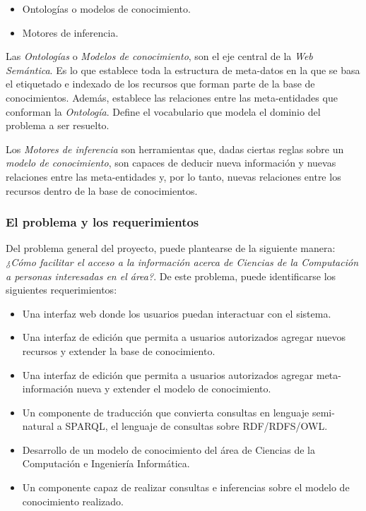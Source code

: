 \begin{itemize}
\item Ontologías o modelos de conocimiento.
\item Motores de inferencia.
\end{itemize}

Las \textit{Ontologías} o \textit{Modelos de conocimiento}, son el eje central de la \textit{Web Semántica}. Es lo que establece toda la estructura de meta-datos en la que se basa el etiquetado e indexado de los recursos que forman parte de la base de conocimientos. Además, establece las relaciones entre las meta-entidades que conforman la \textit{Ontología}. Define el vocabulario que modela el dominio del problema a ser resuelto.

Los \textit{Motores de inferencia} son herramientas que, dadas ciertas reglas sobre un \textit{modelo de conocimiento}, son capaces de deducir nueva información y nuevas relaciones entre las meta-entidades y, por lo tanto, nuevas relaciones entre los recursos dentro de la base de conocimientos.

\subsubsection{El problema y los requerimientos}
Del problema general del proyecto, puede plantearse de la siguiente manera: \textit{¿Cómo facilitar el acceso a la información acerca de Ciencias de la Computación a personas interesadas en el área?}. De este problema, puede identificarse los siguientes requerimientos:

\begin{itemize}
\item Una interfaz web donde los usuarios puedan interactuar con el sistema.
\item Una interfaz de edición que permita a usuarios autorizados agregar nuevos recursos y extender la base de conocimiento.
\item Una interfaz de edición que permita a usuarios autorizados agregar meta-información nueva y extender el modelo de conocimiento.
\item Un componente de traducción que convierta consultas en lenguaje semi-natural a SPARQL, el lenguaje de consultas sobre RDF/RDFS/OWL.
\item Desarrollo de un modelo de conocimiento del área de Ciencias de la Computación e Ingeniería Informática.
\item Un componente capaz de realizar consultas e inferencias sobre el modelo de conocimiento realizado.
\end{itemize}

